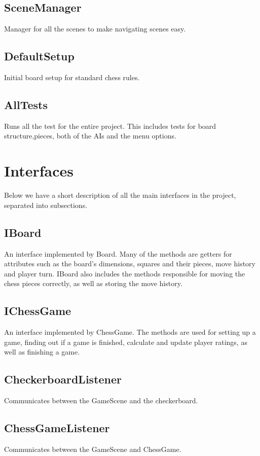\documentclass{article}
\begin{document}
\subsection {SceneManager}
Manager for all the scenes to make navigating scenes easy.

\subsection {DefaultSetup}
Initial board setup for standard chess rules.

\subsection {AllTests}
Runs all the test for the entire project. This includes tests for board structure,pieces, both of the AIs and the menu options.

\section {Interfaces}
Below we have a short description of all the main interfaces in the project, separated into subsections.

\subsection {IBoard}
An interface implemented by Board. Many of the methods are getters for attributes such as the board's dimensions, squares and their pieces, move history and player turn. IBoard also includes the methods responsible for moving the chess pieces correctly, as well as storing the move history.

\subsection {IChessGame}
An interface implemented by ChessGame. The methods are used for setting up a game, finding out if a game is finished, calculate and update player ratings, as well as finishing a game. 

\subsection {CheckerboardListener}
Communicates between the GameScene and the checkerboard. 

\subsection {ChessGameListener}
Communicates between the GameScene and ChessGame.
\end{document}
